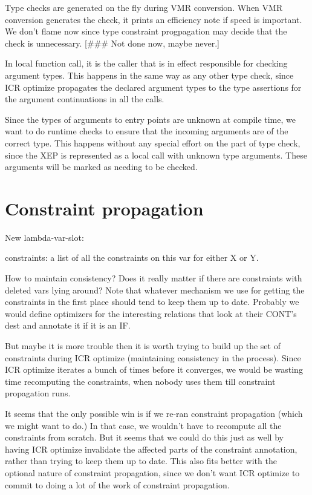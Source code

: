 Type checks are generated on the fly during VMR conversion.  When VMR
conversion generates the check, it prints an efficiency note if speed is
important.  We don't flame now since type constraint progpagation may decide
that the check is unnecessary.  [\#\#\# Not done now, maybe never.]

In local function call, it is the caller that is in effect responsible for
checking argument types.  This happens in the same way as any other type check,
since ICR optimize propagates the declared argument types to the type
assertions for the argument continuations in all the calls.

Since the types of arguments to entry points are unknown at compile time, we
want to do runtime checks to ensure that the incoming arguments are of the
correct type.  This happens without any special effort on the part of type
check, since the XEP is represented as a local call with unknown type
arguments.  These arguments will be marked as needing to be checked.


\chapter{Constraint propagation}

New lambda-var-slot:

constraints: a list of all the constraints on this var for either X or Y.

How to maintain consistency?  Does it really matter if there are constraints
with deleted vars lying around?  Note that whatever mechanism we use for
getting the constraints in the first place should tend to keep them up to date.
Probably we would define optimizers for the interesting relations that look at
their CONT's dest and annotate it if it is an IF.

But maybe it is more trouble then it is worth trying to build up the set of
constraints during ICR optimize (maintaining consistency in the process).
Since ICR optimize iterates a bunch of times before it converges, we would be
wasting time recomputing the constraints, when nobody uses them till constraint
propagation runs.  

It seems that the only possible win is if we re-ran constraint propagation
(which we might want to do.)  In that case, we wouldn't have to recompute all
the constraints from scratch.  But it seems that we could do this just as well
by having ICR optimize invalidate the affected parts of the constraint
annotation, rather than trying to keep them up to date.  This also fits better
with the optional nature of constraint propagation, since we don't want ICR
optimize to commit to doing a lot of the work of constraint propagation.  

